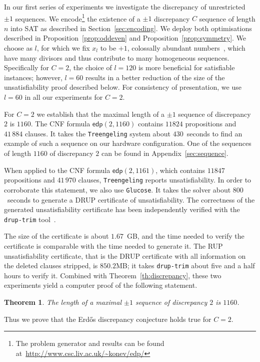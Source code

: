 \documentclass{article} \usepackage[utf8]{inputenc}
\newcommand*{\edp}{\ensuremath{\mathsf{edp}}}
\newcommand*{\Treengeling}{\texttt{Treengeling}\xspace}
\newcommand*{\Glucose}{\texttt{Glucose}\xspace}
\newcommand*{\druptrim}{\texttt{drup-trim}\xspace}
\newtheorem{theorem}{Theorem}
\begin{document}
In our first series of experiments we investigate the discrepancy of
unrestricted $\pm1$ sequences.  We encode\footnote{The problem generator and results can be found at~\url{http://www.csc.liv.ac.uk/~konev/edp/}} the existence of a $\pm1$ discrepancy
$C$ sequence of length $n$ into SAT as described in
Section~\ref{sec:encoding}. We deploy both optimisations described in
Proposition~\ref{prop:oddeven} and Proposition~\ref{prop:symmetry}. 
We choose as $l$, for which we fix $x_l$ to be $+1$, colossally abundant numbers~\cite{abundant},
which have many divisors and thus contribute to many homogeneous sequences.
Specifically for $C=2$, the choice of
$l=120$ is more beneficial for satisfiable instances; however,
$l={60}$ results in a better reduction of the size of the unsatisfiability proof described below.
For consistency of presentation, we use $l=60$ in all our experiments for
$C=2$.

For $C=2$ we establish that the maximal length of a $\pm 1$
sequence of discrepancy $2$ is $1160$. 
The CNF formula $\edp(2, 1160)$ contains $11824$ propositions and  $41\,884$ clauses.
It takes the \Treengeling system about 
${430}$~seconds to find an example of such a sequence 
on our hardware configuration.  
One of the  sequences of length $1160$ of discrepancy
$2$ can be found in Appendix~\ref{sec:sequence}.

When  applied to the CNF formula $\edp(2, 1161)$, which contains $11847$
propositions and  $41\,970$ clauses, \Treengeling reports unsatisfiability. 
In order to corroborate this statement, we also use \Glucose.  It takes the
solver about ${800}$~seconds to  generate a DRUP certificate of
unsatisfiability.  The correctness of the generated unsatisfiability
certificate has been independently verified with the \druptrim
tool~\cite{druptrim}. 

The size of the certificate is about $\textrm{1.67}$~GB,
and the time needed to verify the certificate is comparable with the time
needed to generate it.  The RUP unsatisfiability certificate, that is the DRUP
certificate with all information on the deleted clauses stripped, is $850.2$MB;
it takes \druptrim about five and a half hours to verify it.  Combined with
Theorem~\ref{th:discrepancy},  these two experiments yield  a computer proof of
the following statement.
\begin{theorem}\label{th:edp2}
The length of a maximal  $\pm1$ sequence of discrepancy $2$ is $1160$.
\end{theorem}
Thus we prove that the Erd\H{o}s discrepancy conjecture holds true for $C=2$.
\end{document}
